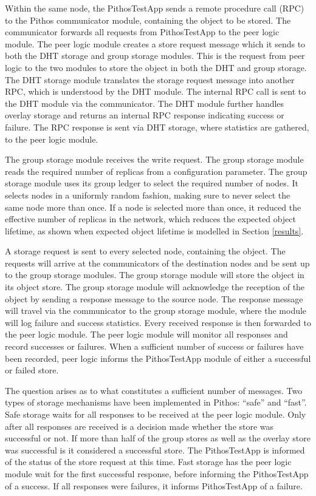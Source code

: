 Within the same node, the PithosTestApp sends a remote procedure call (RPC) to the Pithos communicator module, containing the object to be stored. The communicator forwards all requests from PithosTestApp to the peer logic module. The peer logic module creates a store request message which it sends to both the DHT storage and group storage modules. This is the request from peer logic to the two modules to store the object in both the DHT and group storage. The DHT storage module translates the storage request message into another RPC, which is understood by the DHT module. The internal RPC call is sent to the DHT module via the communicator. The DHT module further handles overlay storage and returns an internal RPC response indicating success or failure. The RPC response is sent via DHT storage, where statistics are gathered, to the peer logic module.

The group storage module receives the write request. The group storage module reads the required number of replicas from a configuration parameter. The group storage module uses its group ledger to select the required number of nodes. It selects nodes in a uniformly random fashion, making sure to never select the same node more than once. If a node is selected more than once, it reduced the effective number of replicas in the network, which reduces the expected object lifetime, as shown when expected object lifetime is modelled in Section \ref{results}.

A storage request is sent to every selected node, containing the object. The requests will arrive at the communicators of the destination nodes and be sent up to the group storage modules. The group storage module will store the object in its object store. The group storage module will acknowledge the reception of the object by sending a response message to the source node. The response message will travel via the communicator to the group storage module, where the module will log failure and success statistics. Every received response is then forwarded to the peer logic module. The peer logic module will monitor all responses and record successes or failures. When a sufficient number of success or failures have been recorded, peer logic informs the PithosTestApp module of either a successful or failed store.

The question arises as to what constitutes a sufficient number of messages. Two types of storage mechanisms have been implemented in Pithos: ``safe'' and ``fast''. Safe storage waits for all responses to be received at the peer logic module. Only after all responses are received is a decision made whether the store was successful or not. If more than half of the group stores as well as the overlay store was successful is it considered a successful store. The PithosTestApp is informed of the status of the store request at this time. Fast storage has the peer logic module wait for the first successful response, before informing the PithosTestApp of a success. If all responses were failures, it informs PithosTestApp of a failure.

